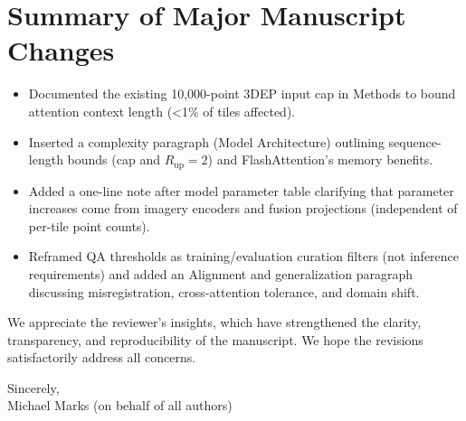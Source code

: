 \documentclass[11pt]{article}
\begin{document}
\section*{Summary of Major Manuscript Changes}
\begin{itemize}
  \item Documented the existing 10,000-point 3DEP input cap in Methods to bound attention context length (\textless1\% of tiles affected).
  \item Inserted a complexity paragraph (Model Architecture) outlining sequence-length bounds (cap and $R_{\text{up}}{=}2$) and FlashAttention’s memory benefits.
  \item Added a one-line note after model parameter table clarifying that parameter increases come from imagery encoders and fusion projections (independent of per-tile point counts).
  \item Reframed QA thresholds as training/evaluation curation filters (not inference requirements) and added an Alignment and generalization paragraph discussing misregistration, cross-attention tolerance, and domain shift.

\end{itemize}

We appreciate the reviewer's insights, which have strengthened the clarity, transparency, and reproducibility of the manuscript. We hope the revisions satisfactorily address all concerns.

\vspace{1em}
\noindent Sincerely,\\[4pt]
Michael Marks (on behalf of all authors)
\end{document}
